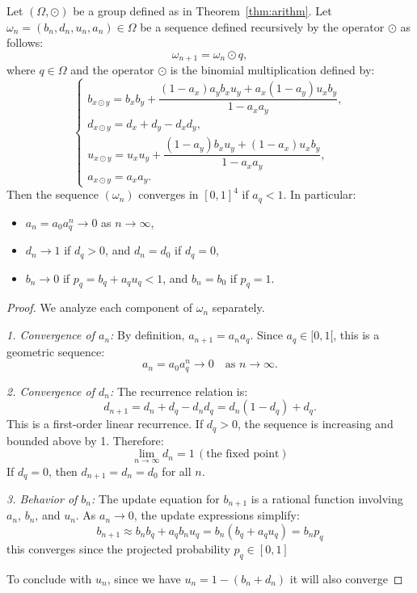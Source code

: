 \begin{theorem}\label{thm:geo}
Let $(\Omega, \odot)$ be a group defined as in Theorem~\ref{thm:arithm}.
Let $\omega_n = (b_n, d_n, u_n, a_n) \in \Omega$ be a sequence defined recursively by the operator $\odot$ as follows:
\[
\omega_{n+1} = \omega_n \odot q,
\]
where \(q\in \Omega\) and the operator $\odot$ is the binomial multiplication defined by:
\[
\begin{cases}
b_{x \odot y} = b_x b_y + \dfrac{(1 - a_x) a_y b_x u_y + a_x (1 - a_y) u_x b_y}{1 - a_x a_y}, \\
d_{x \odot y} = d_x + d_y - d_x d_y, \\
u_{x \odot y} = u_x u_y + \dfrac{(1 - a_y) b_x u_y + (1 - a_x) u_x b_y}{1 - a_x a_y}, \\
a_{x \odot y} = a_x a_y.
\end{cases}
\]
Then the sequence $(\omega_n)$ converges in $[0,1]^4$ if $a_q < 1$. In particular:
\begin{itemize}
    \item $a_n = a_0 a_q^n \to 0$ as $n \to \infty$,
    \item $d_n \to 1$ if $d_q > 0$, and $d_n = d_0$ if $d_q = 0$,
    \item $b_n \to 0 $ if $p_q = b_q + a_q u_q < 1$, and $b_n = b_0 $ if $p_q = 1$.
\end{itemize}
\end{theorem}

\begin{proof}
We analyze each component of $\omega_n$ separately.

\emph{1. Convergence of $a_n$:}  
By definition, $a_{n+1} = a_n a_q$. Since $a_q \in [0,1[$, this is a geometric sequence:
\[
a_n = a_0 a_q^n \to 0 \quad \text{as } n \to \infty.
\]

\emph{2. Convergence of $d_n$:}  
The recurrence relation is:
\[
d_{n+1} = d_n + d_q - d_n d_q = d_n (1 - d_q) + d_q.
\]
This is a first-order linear recurrence. If $d_q > 0$, the sequence is increasing and bounded above by 1. Therefore:
\[
\lim_{n \to \infty} d_n = 1\, (\text{the fixed point})
\]
If $d_q = 0$, then $d_{n+1} = d_n = d_0$ for all $n$.

\emph{3. Behavior of $b_n$:}  
The update equation for $b_{n+1}$ is a rational function involving $a_n$, $b_n$, and $u_n$. As $a_n \to 0$, the update expressions simplify:
\[
b_{n+1} \approx b_n b_q + a_q b_n u_q = b_n (b_q + a_q u_q ) = b_n p_q
\]
this converges since the projected probability \(p_q \in [0,1] \)
 
To conclude with \(u_n\), since we have \(u_n = 1 - (b_n + d_n)\) it will also converge

\end{proof}

